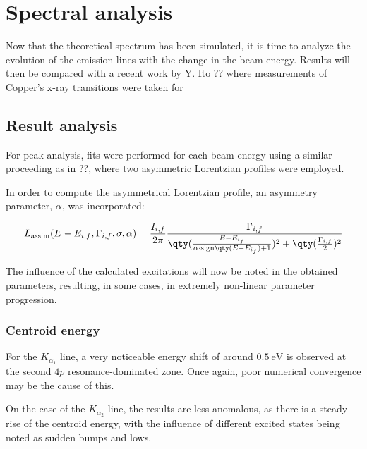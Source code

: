 
%

\chapter{Spectral analysis}

Now that the theoretical spectrum has been simulated, it is time to analyze the evolution of the emission lines with the change in the beam energy. Results will then be compared with a recent work by Y. Ito ?? where measurements of Copper's x-ray transitions were taken for



\section{Result analysis}

For peak analysis, fits were performed for each beam energy using a similar proceeding as in ??, where two asymmetric Lorentzian profiles were employed.

In order to compute the asymmetrical Lorentzian profile, an asymmetry parameter, $\alpha$, was incorporated:

\begin{equation}
    L_{\text{assim}}(E-E_{i,f},\Gamma_{i,f},\sigma,\alpha)=\frac{I_{i,f}}{2\pi}\frac{\Gamma_{i,f}}{\qty(\frac{E-E_{i_f}}{\alpha\cdot \text{sign}\qty(E-E_{i_f})+1})^2+\qty(\frac{\Gamma_{i,f}}{2})^2}
\end{equation}

The influence of the calculated excitations will now be noted in the obtained parameters, resulting, in some cases, in extremely non-linear parameter progression.
\subsection{Centroid energy}

For the $K_{\alpha_1}$ line, a very noticeable energy shift of around $0.5\ \si{\electronvolt}$ is observed at the second $4p$ resonance-dominated zone. Once again, poor numerical convergence may be the cause of this.

On the case of the $K_{\alpha_2}$ line, the results are less anomalous, as there is a steady rise of the centroid energy, with the influence of different excited states being noted as sudden bumps and lows.

